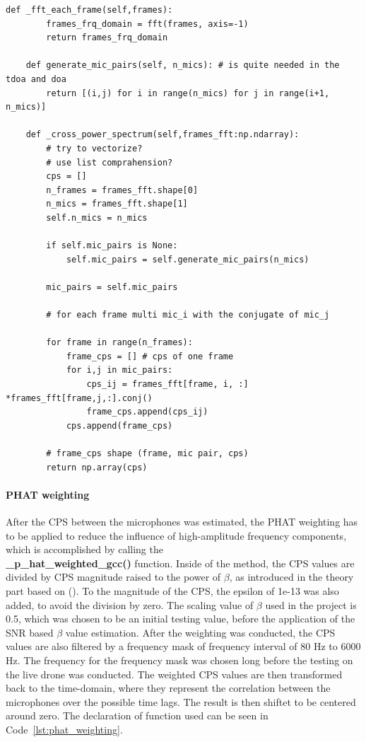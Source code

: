     \begin{lstlisting}[style=pythonstyle, caption={Functions used to fing the CPS of the microphone pair, before the PHAT weighting.}, label={lst:fft_and_cps}]
    def _fft_each_frame(self,frames):
        frames_frq_domain = fft(frames, axis=-1)
        return frames_frq_domain
    
    def generate_mic_pairs(self, n_mics): # is quite needed in the tdoa and doa
        return [(i,j) for i in range(n_mics) for j in range(i+1, n_mics)]

    def _cross_power_spectrum(self,frames_fft:np.ndarray):
        # try to vectorize?
        # use list comprahension?
        cps = []
        n_frames = frames_fft.shape[0]
        n_mics = frames_fft.shape[1]
        self.n_mics = n_mics

        if self.mic_pairs is None:
            self.mic_pairs = self.generate_mic_pairs(n_mics)
        
        mic_pairs = self.mic_pairs

        # for each frame multi mic_i with the conjugate of mic_j

        for frame in range(n_frames): 
            frame_cps = [] # cps of one frame
            for i,j in mic_pairs:
                cps_ij = frames_fft[frame, i, :] *frames_fft[frame,j,:].conj()
                frame_cps.append(cps_ij)
            cps.append(frame_cps)

        # frame_cps shape (frame, mic pair, cps)
        return np.array(cps)
        \end{lstlisting}
    
    \paragraph{PHAT weighting}
    After the CPS between the microphones was estimated, the PHAT weighting has to be applied to reduce the influence of high-amplitude frequency components, which is accomplished by calling the\\
    \textbf{\_p\_hat\_weighted\_gcc()} function. Inside of the method, the CPS values are divided by CPS magnitude raised to the power of $\beta$, as introduced in the theory part based on (\cite{kang2016prefiltering}). To the magnitude of the CPS, the epsilon of 1e-13 was also added, to avoid the division by zero. The scaling value of $\beta$ used in the project is 0.5, which was chosen to be an initial testing value, before the application of the SNR based $\beta$ value estimation. After the weighting was conducted, the CPS values are also filtered by a frequency mask of frequency interval of 80 Hz to 6000 Hz. The frequency for the frequency mask was chosen long before the testing on the live drone was conducted. The weighted CPS values are then transformed back to the time-domain, where they represent the correlation between the microphones over the possible time lags. The result is then shiftet to be centered around zero. The declaration of function used can be seen in Code~\ref{lst:phat_weighting}.\\


